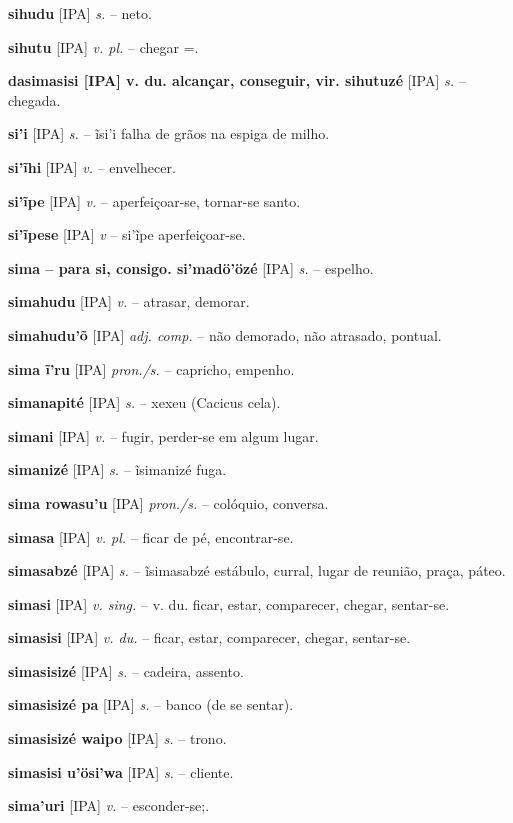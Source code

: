 {\textbf{sihudu} [IPA] \textit{s.} -- neto.

\textbf{sihutu} [IPA] \textit{v. pl.} -- chegar =.

\textbf{dasimasisi [IPA] v. du. alcançar, conseguir, vir. sihutuzé} [IPA] \textit{s.} -- chegada.

\textbf{si'i} [IPA] \textit{s.} -- ĩsi'i falha de grãos na espiga de milho.

\textbf{si'ĩhi} [IPA] \textit{v.} -- envelhecer.

\textbf{si'ĩpe} [IPA] \textit{v.} -- aperfeiçoar-se, tornar-se santo.

\textbf{si'ĩpese} [IPA] \textit{v} -- si'ĩpe aperfeiçoar-se.

\textbf{sima -- para si, consigo. si'madö'özé} [IPA] \textit{s.} -- espelho.

\textbf{simahudu} [IPA] \textit{v.} -- atrasar, demorar.

\textbf{simahudu'õ} [IPA] \textit{adj. comp.} -- não demorado, não atrasado, pontual.

\textbf{sima ĩ'ru} [IPA] \textit{pron./s.} -- capricho, empenho.

\textbf{simanapité} [IPA] \textit{s.} -- xexeu (Cacicus cela).

\textbf{simani} [IPA] \textit{v.} -- fugir, perder-se em algum lugar.

\textbf{simanizé} [IPA] \textit{s.} -- ĩsimanizé fuga.

\textbf{sima rowasu'u} [IPA] \textit{pron./s.} -- colóquio, conversa.

\textbf{simasa} [IPA] \textit{v. pl.} -- ficar de pé, encontrar-se.

\textbf{simasabzé} [IPA] \textit{s.} -- ĩsimasabzé estábulo, curral, lugar de reunião, praça, páteo.

\textbf{simasi} [IPA] \textit{v. sing.} -- v. du. ficar, estar, comparecer, chegar, sentar-se.

\textbf{simasisi} [IPA] \textit{v. du.} -- ficar, estar, comparecer, chegar, sentar-se.

\textbf{simasisizé} [IPA] \textit{s.} -- cadeira, assento.

\textbf{simasisizé pa} [IPA] \textit{s.} -- banco (de se sentar).

\textbf{simasisizé waipo} [IPA] \textit{s.} -- trono.

\textbf{simasisi u'ösi'wa} [IPA] \textit{s.} -- cliente.

\textbf{sima'uri} [IPA] \textit{v.} -- esconder-se;.

}
